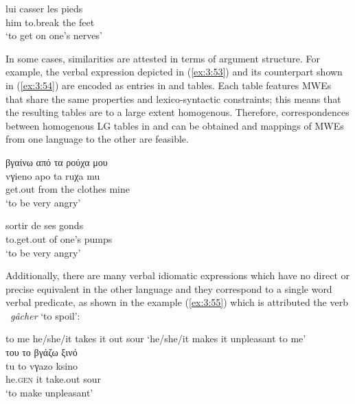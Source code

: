 \documentclass[output=paper]{langsci/langscibook}
\begin{document}
\begin{exe}
\ex \label{ex:3:52}
\gll lui casser les pieds \\
 him to.break the feet\\
\glt ‘to get on one’s nerves’
\end{exe}


In some cases, similarities are attested in terms of argument
structure. For example, the\textit{ }\textit{\textup{}}
verbal expression depicted in (\ref{ex:3:53}) and its  counterpart shown in (\ref{ex:3:54}) 
are encoded as entries in  and  tables. Each table features MWEs
that share the same properties and lexico-syntactic constraints; this
means that the resulting tables are to a large extent homogenous.
Therefore, correspondences between homogenous LG tables 
in  and 
can be obtained and mappings of MWEs from one language to the other are
feasible.


\begin{exe}
\ex \label{ex:3:53}
\glll βγαίνω από τα ρούχα μου \\
vγieno apo ta ruχa mu\\
get.out from the clothes mine\\
\glt %
‘to be very angry’
\end{exe}

\begin{exe}
\ex \label{ex:3:54}
\gll sortir de ses gonds\\
 to.get.out of one’s pumps\\
\glt ‘to be very angry’
\end{exe}

Additionally, there are many verbal idiomatic expressions which have no
direct or precise equivalent in the other language and they correspond
to a single word verbal predicate, as shown in the  example (\ref{ex:3:55})
which is attributed the  verb \ \textit{gâcher }‘to spoil’:

\begin{exe}
\ex \label{ex:3:55}
to me he/she/it takes it out sour `he/she/it makes it unpleasant to me'\\
\glll του το βγάζω ξινό \\
tu to vγazo ksino \\
he.\textsc{gen} it take.out sour\\
\glt %
‘to make unpleasant’
\end{exe}
\end{document}

